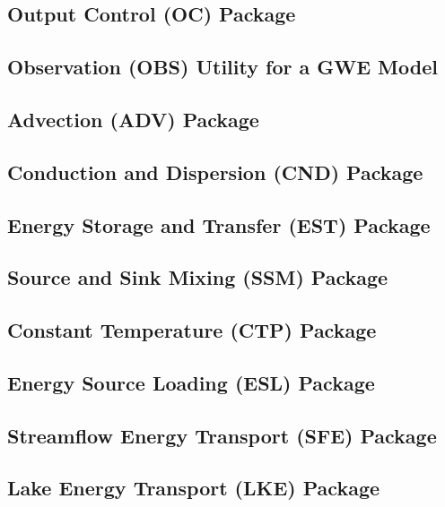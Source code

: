 \newpage
\subsection{Output Control (OC) Package}


\newpage
\subsection{Observation (OBS) Utility for a GWE Model}


\newpage
\subsection{Advection (ADV) Package}


\newpage
\subsection{Conduction and Dispersion (CND) Package}


\newpage
\subsection{Energy Storage and Transfer (EST) Package}


\newpage
\subsection{Source and Sink Mixing (SSM) Package}


\newpage
\subsection{Constant Temperature (CTP) Package}


\newpage
\subsection{Energy Source Loading (ESL) Package}


\newpage
\subsection{Streamflow Energy Transport (SFE) Package}


\newpage
\subsection{Lake Energy Transport (LKE) Package}


